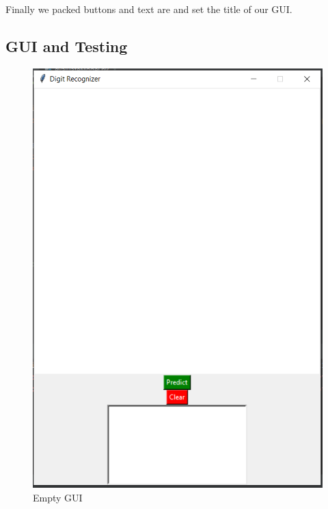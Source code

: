 \documentclass[onecolumn]{article}
\begin{document}
Finally we packed buttons and text are and set the title of our GUI.




\vspace{45mm}

\subsection{GUI and Testing}

\begin{figure}[h!]
  \centering
  \begin{minipage}[b]{0.3\textwidth}
    \includegraphics[width=\textwidth]{gui2.PNG}
    \caption{Empty GUI}
  \end{minipage}
  \hfill
  \begin{minipage}[b]{0.6\textwidth}

\end{minipage}
\end{figure}
\end{document}
